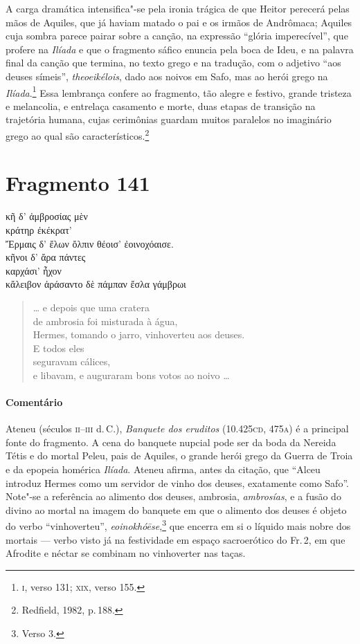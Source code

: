A carga dramática intensifica"-se pela ironia trágica de que Heitor perecerá
pelas mãos de Aquiles, que já haviam matado o pai e os irmãos de Andrômaca; Aquiles cuja sombra parece pairar sobre a canção, na expressão ``glória imperecível'', que profere na \emph{Ilíada} e que o fragmento sáfico enuncia pela boca de Ideu, e na palavra final da canção que termina, no texto grego e na tradução, com o adjetivo ``aos deuses símeis'', \emph{theoeikélois}, dado aos noivos em Safo, mas ao herói grego na \emph{Ilíada}.\footnote{\textsc{i}, verso 131; \textsc{xix}, verso 155.}
Essa lembrança confere ao fragmento, tão alegre e festivo, grande tristeza e
melancolia, e entrelaça casamento e morte, duas etapas de transição na trajetória
humana, cujas cerimônias guardam muitos paralelos no imaginário grego ao qual são característicos.\footnote{Redfield, 1982, p.\,188.}




\section{Fragmento 141}

\begin{gkverse}
κῆ δ’ ἀμβροσίας μὲν\\
κράτηρ ἐκέκρατ’\\
Ἔρμαις δ’ ἔλων ὄλπιν θέοισ’ ἐοινοχόαισε.\\
κῆνοι δ’ ἄρα πάντες\\
καρχάσι’ ἦχον\\
κἄλειβον ἀράσαντο δὲ πάμπαν ἔσλα γάμβρωι
\end{gkverse}

\begin{verse}
\ldots{} e depois que uma cratera\\
de ambrosia foi misturada à água,\\
Hermes, tomando o jarro, vinhoverteu aos deuses.\\
E todos eles\\
seguravam cálices,\\
e libavam, e auguraram bons votos ao noivo \ldots{}
\end{verse}

\medskip

\paragraph{Comentário}
Ateneu (séculos \textsc{ii--iii} d.\,C.), \emph{Banquete dos eruditos} (10.425\textsc{cd}, 475\textsc{a}) é a principal fonte do fragmento. A cena  do  banquete nupcial pode ser da boda da Nereida Tétis e do mortal Peleu, pais de Aquiles, o grande herói grego da Guerra de Troia e da epopeia homérica \emph{Ilíada}. Ateneu afirma, antes da citação, que ``Alceu introduz Hermes como um servidor de vinho dos deuses, exatamente como Safo''. Note"-se a referência ao alimento dos deuses, ambrosia, \emph{ambrosías}, e a fusão do divino ao mortal na imagem do banquete em que o alimento dos deuses é objeto do verbo ``vinhoverteu'', \emph{eoinokhóēse},\footnote{Verso 3.} que encerra em si o líquido mais nobre dos mortais --- verbo visto já na festividade em espaço sacroerótico do Fr.\,2, em que Afrodite e néctar se combinam no vinhoverter nas taças.


